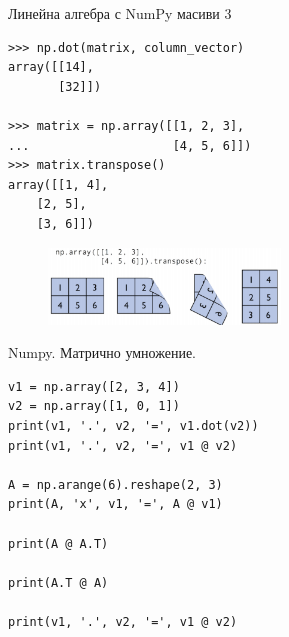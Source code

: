 \documentclass{beamer}
\begin{document}
\begin{frame}[fragile]{Линейна алгебра с NumPy масиви 3 }

\begin{verbatim}
>>> np.dot(matrix, column_vector)
array([[14],
       [32]])

>>> matrix = np.array([[1, 2, 3],
...                    [4, 5, 6]])
>>> matrix.transpose()
array([[1, 4],
    [2, 5],
    [3, 6]])
\end{verbatim}
\begin{figure}
    \centering
    \includegraphics[width=0.55\textwidth]{np9.png}
\end{figure}
\end{frame}

\begin{frame}[fragile]{Numpy. Матрично умножение.}
\begin{lstlisting}
v1 = np.array([2, 3, 4])
v2 = np.array([1, 0, 1])
print(v1, '.', v2, '=', v1.dot(v2))
print(v1, '.', v2, '=', v1 @ v2)

A = np.arange(6).reshape(2, 3)
print(A, 'x', v1, '=', A @ v1)

print(A @ A.T)

print(A.T @ A)

print(v1, '.', v2, '=', v1 @ v2)

\end{lstlisting}

\end{frame}
\end{document}
